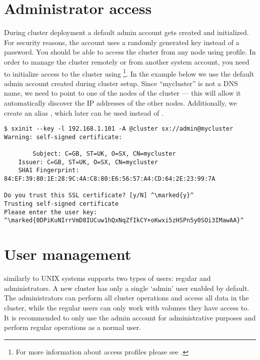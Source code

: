\section{Administrator access}
During cluster deployment a default admin account gets created
and initialized. For security reasons, the account uses a randomly
generated key instead of a password. You should be able to access the
cluster from any node using  profile. In order
to manage the cluster remotely or from another system account,
you need to initialize access to the cluster using 
\footnote{For more information about access profiles please see
.}. 
In the example below we use the default admin account created
during cluster setup. Since ``mycluster'' is not a DNS name, we need
to point  to one of the nodes of the cluster --- this will
allow it automatically discover the IP addresses of the other nodes.
Additionally, we create an alias , which later
can be used instead of .
\begin{lstlisting}
$ sxinit --key -l 192.168.1.101 -A @cluster sx://admin@mycluster
Warning: self-signed certificate:

        Subject: C=GB, ST=UK, O=SX, CN=mycluster
	Issuer: C=GB, ST=UK, O=SX, CN=mycluster
	SHA1 Fingerprint: 84:EF:39:80:1E:28:9C:4A:C8:80:E6:56:57:A4:CD:64:2E:23:99:7A

Do you trust this SSL certificate? [y/N] ^\marked{y}^
Trusting self-signed certificate
Please enter the user key: ^\marked{0DPiKuNIrrVmD8IUCuw1hQxNqZfIkCY+oKwxi5zHSPn5y0SOi3IMawAA}^
\end{lstlisting}

\section{User management}
\SX similarly to UNIX systems supports two types of users: regular and
administrators. A new cluster has only a single `admin' user enabled by
default. The administrators can perform all cluster operations and access
all data in the cluster, while the regular users can only work with volumes
they have access to. It is recommended to only use the admin account for
administrative purposes and perform regular operations as a normal user.

